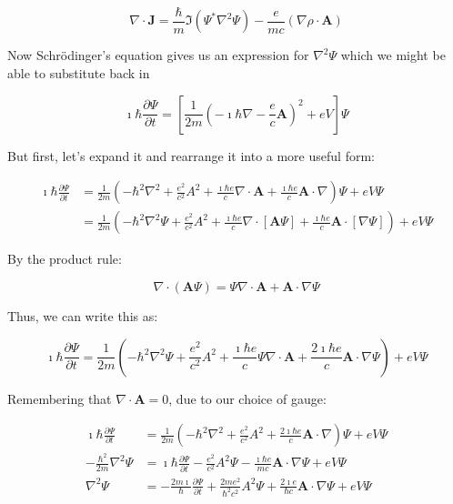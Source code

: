 \documentclass{article}
\begin{document}
\begin{equation}
    \nabla \cdot \mathbf{J} = \frac{\hbar}{m}\Im\left(\Psi^*\nabla^2\Psi\right) -
    \frac{e}{mc}\left(\nabla\rho \cdot \mathbf{A}\right)
\end{equation}

Now Schr\"odinger's equation gives us an expression for $\nabla^2\Psi$ which we
might be able to substitute back in

\begin{equation}
    \label{schrodinger}
    \imath\hbar\frac{\partial\Psi}{\partial t} =
    \left[\frac{1}{2m}\left(-\imath\hbar\nabla - \frac{e}{c}\mathbf{A}\right)^2
    + eV\right]\Psi
\end{equation}

But first, let's expand it and rearrange it into a more useful form:

\begin{align}
    \imath\hbar\frac{\partial\Psi}{\partial t} &= \frac{1}{2m}\left(-\hbar^2\nabla^2 +
    \frac{e^2}{c^2}A^2 + \frac{\imath\hbar e}{c}\nabla \cdot \mathbf{A} +
    \frac{\imath\hbar e}{c}\mathbf{A} \cdot \nabla \right)\Psi + eV\Psi \\
    &= \frac{1}{2m}\left(-\hbar^2\nabla^2\Psi + \frac{e^2}{c^2}A^2 +
    \frac{\imath\hbar e}{c}\nabla \cdot [\mathbf{A}\Psi] + \frac{\imath\hbar
    e}{c}\mathbf{A} \cdot [\nabla \Psi] \right) + eV\Psi
\end{align}

By the product rule:

\begin{equation}
    \nabla \cdot (\mathbf{A}\Psi) = \Psi \nabla \cdot \mathbf{A} + \mathbf{A}
    \cdot \nabla \Psi
\end{equation}

Thus, we can write this as:

\begin{equation}
    \imath\hbar\frac{\partial \Psi}{\partial t} = \frac{1}{2m}\left(-\hbar^2\nabla^2\Psi + \frac{e^2}{c^2}A^2 +
    \frac{\imath\hbar e}{c}\Psi \nabla \cdot \mathbf{A} + \frac{2\imath\hbar
    e}{c}\mathbf{A} \cdot \nabla \Psi \right) + eV\Psi
\end{equation}

Remembering that $\nabla \cdot \mathbf{A} = 0$, due to our choice of gauge:

\begin{align}
    \imath\hbar\frac{\partial\Psi}{\partial t} &=
    \frac{1}{2m}\left(-\hbar^2\nabla^2 + \frac{e^2}{c^2}A^2 + \frac{2\imath\hbar
    e}{c}\mathbf{A} \cdot \nabla \right) \Psi + eV\Psi \\
    -\frac{\hbar^2}{2m}\nabla^2\Psi &= \imath\hbar\frac{\partial\Psi}{\partial
    t} - \frac{e^2}{c^2}A^2\Psi - \frac{\imath\hbar e}{mc}\mathbf{A} \cdot \nabla
    \Psi + eV\Psi \\
    \nabla^2\Psi &= -\frac{2m\imath}{\hbar}\frac{\partial\Psi}{\partial t} +
    \frac{2me^2}{\hbar^2c^2}A^2\Psi + \frac{2\imath e}{\hbar c}\mathbf{A} \cdot
    \nabla\Psi + eV\Psi
\end{align}
\end{document}
